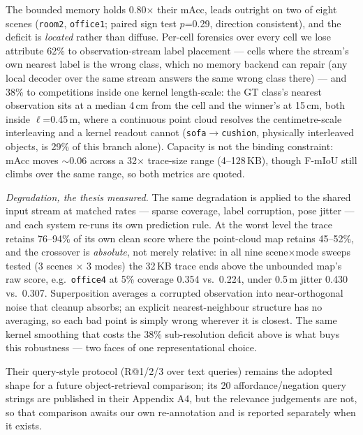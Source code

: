 \documentclass[conference]{IEEEtran}
\begin{document}
The bounded memory holds 0.80$\times$ their mAcc, leads outright on two
of eight scenes (\texttt{room2}, \texttt{office1}; paired sign test
$p$=0.29, direction consistent), and the deficit is \emph{located}
rather than diffuse. Per-cell forensics over every cell we lose
attribute 62\% to observation-stream label placement --- cells where the
stream's own nearest label is the wrong class, which no memory backend
can repair (any local decoder over the same stream answers the same
wrong class there) --- and 38\% to competitions inside one kernel
length-scale: the GT class's nearest observation sits at a median
4\,cm from the cell and the winner's at 15\,cm, both inside
$\ell$=0.45\,m, where a continuous point cloud resolves the
centimetre-scale interleaving and a kernel readout cannot
(\texttt{sofa}$\to$\texttt{cushion}, physically interleaved objects, is
29\% of this branch alone). Capacity is not the binding constraint:
mAcc moves $\sim$0.06 across a 32$\times$ trace-size range (4--128\,KB),
though F-mIoU still climbs over the same range, so both metrics are
quoted.

\emph{Degradation, the thesis measured.} The same degradation is
applied to the shared input stream at matched rates --- sparse coverage,
label corruption, pose jitter --- and each system re-runs its own
prediction rule. At the worst level the trace retains 76--94\% of its
own clean score where the point-cloud map retains 45--52\%, and the
crossover is \emph{absolute}, not merely relative: in all nine
scene$\times$mode sweeps tested (3 scenes $\times$ 3 modes) the 32\,KB
trace ends above the unbounded map's raw score, e.g.\ \texttt{office4}
at 5\% coverage 0.354 vs.\ 0.224, under 0.5\,m jitter 0.430 vs.\ 0.307.
Superposition averages a corrupted observation into near-orthogonal
noise that cleanup absorbs; an explicit nearest-neighbour structure has
no averaging, so each bad point is simply wrong wherever it is closest.
The same kernel smoothing that costs the 38\% sub-resolution deficit
above is what buys this robustness --- two faces of one
representational choice.

Their query-style protocol (R@1/2/3 over text queries) remains the
adopted shape for a future object-retrieval comparison; its 20
affordance/negation query strings are published in their Appendix A4,
but the relevance judgements are not, so that comparison awaits our own
re-annotation and is reported separately when it exists.
\end{document}
